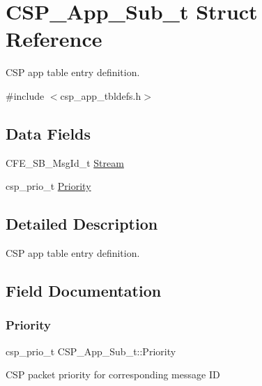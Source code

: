 \hypertarget{structCSP__App__Sub__t}{}\section{C\+S\+P\+\_\+\+App\+\_\+\+Sub\+\_\+t Struct Reference}
\label{structCSP__App__Sub__t}


C\+SP app table entry definition.  




{\ttfamily \#include $<$csp\+\_\+app\+\_\+tbldefs.\+h$>$}

\subsection*{Data Fields}
\begin{DoxyCompactItemize}
\item 
C\+F\+E\+\_\+\+S\+B\+\_\+\+Msg\+Id\+\_\+t \hyperlink{structCSP__App__Sub__t_a7f63439db2d45246256cced89867b72a}{Stream}
\item 
csp\+\_\+prio\+\_\+t \hyperlink{structCSP__App__Sub__t_ac86d4a5a7b633ff05a489db87a04b41b}{Priority}
\end{DoxyCompactItemize}


\subsection{Detailed Description}
C\+SP app table entry definition. 

\subsection{Field Documentation}
\mbox{\label{structCSP__App__Sub__t_ac86d4a5a7b633ff05a489db87a04b41b}} 
\subsubsection{\texorpdfstring{Priority}{Priority}}
{\footnotesize\ttfamily csp\+\_\+prio\+\_\+t C\+S\+P\+\_\+\+App\+\_\+\+Sub\+\_\+t\+::\+Priority}

C\+SP packet priority for corresponding message ID \mbox{\label{structCSP__App__Sub__t_a7f63439db2d45246256cced89867b72a}} 
